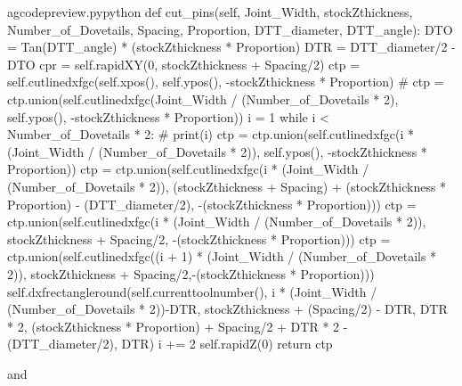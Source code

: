 \documentclass{ltxdoc}
\begin{document}
\lstset{firstnumber=\thegcpy}
\begin{writecode}{a}{gcodepreview.py}{python}
    def cut_pins(self, Joint_Width, stockZthickness, Number_of_Dovetails, Spacing, Proportion, DTT_diameter, DTT_angle):
        DTO = Tan(DTT_angle) * (stockZthickness * Proportion)
        DTR = DTT_diameter/2 - DTO
        cpr = self.rapidXY(0, stockZthickness + Spacing/2)
        ctp = self.cutlinedxfgc(self.xpos(), self.ypos(), -stockZthickness * Proportion)
#        ctp = ctp.union(self.cutlinedxfgc(Joint_Width / (Number_of_Dovetails * 2), self.ypos(), -stockZthickness * Proportion))
        i = 1
        while i < Number_of_Dovetails * 2:
#            print(i)
            ctp = ctp.union(self.cutlinedxfgc(i * (Joint_Width / (Number_of_Dovetails * 2)), self.ypos(), -stockZthickness * Proportion))
            ctp = ctp.union(self.cutlinedxfgc(i * (Joint_Width / (Number_of_Dovetails * 2)), (stockZthickness + Spacing) + (stockZthickness * Proportion) - (DTT_diameter/2), -(stockZthickness * Proportion)))
            ctp = ctp.union(self.cutlinedxfgc(i * (Joint_Width / (Number_of_Dovetails * 2)), stockZthickness + Spacing/2, -(stockZthickness * Proportion)))
            ctp = ctp.union(self.cutlinedxfgc((i + 1) * (Joint_Width / (Number_of_Dovetails * 2)), stockZthickness + Spacing/2,-(stockZthickness * Proportion)))
            self.dxfrectangleround(self.currenttoolnumber(), 
                i * (Joint_Width / (Number_of_Dovetails * 2))-DTR, 
                stockZthickness + (Spacing/2) - DTR, 
                DTR * 2,
                (stockZthickness * Proportion) + Spacing/2 + DTR * 2 - (DTT_diameter/2), 
                DTR)
            i += 2
        self.rapidZ(0)
        return ctp
    
\end{writecode}
\addtocounter{gcpy}{23}

\noindent and
\end{document}
